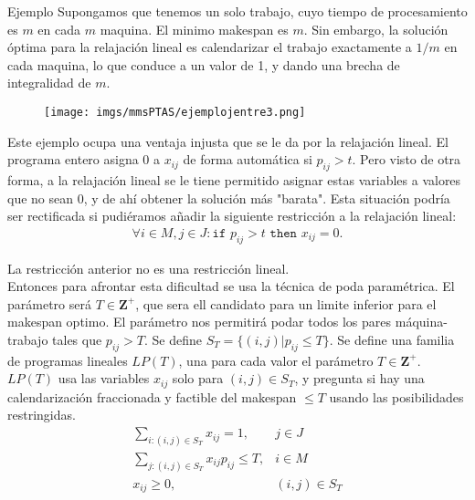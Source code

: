 \begin{frame}{Ejemplo}
Supongamos que tenemos un solo trabajo, cuyo tiempo de procesamiento es $m$ en cada $m$ maquina. El minimo makespan es $m$. Sin embargo, la solución óptima para la relajación lineal es calendarizar el trabajo exactamente a $1/m$ en cada maquina, lo que conduce a un
valor de 1, y dando una brecha de integralidad de $m$.
\begin{figure}
        \texttt{[image: imgs/mmsPTAS/ejemplojentre3.png]}
    \end{figure}
\end{frame}

\begin{frame}{\subsectiontitle}
Este ejemplo ocupa una ventaja injusta que se le da por la relajación lineal. El programa entero asigna 0 a $x_{ij}$ de forma automática si $p_{ij}>t$. Pero visto de otra forma, a la relajación lineal se le tiene permitido asignar estas variables a valores que no sean 0, y de ahí obtener la solución más "barata". Esta situación podría ser rectificada si pudiéramos añadir la siguiente restricción a la relajación lineal:\\
\begin{align*}
    \forall i \in M, j\in J : \texttt{if } p_{ij}>t \texttt{ then } x_{ij} = 0.
\end{align*}
\end{frame}

\begin{frame}{\subsectiontitle}
    La restricción anterior no es una restricción lineal.\\
    Entonces para afrontar esta dificultad se usa la técnica de poda paramétrica. El parámetro será $T\in \mathbf{Z}^+$, que sera ell candidato para un limite inferior para el makespan optimo. El parámetro nos permitirá podar todos los pares máquina-trabajo tales que $p_{ij} > T$. Se define $S_T=\{(i,j)|p_{ij}\leq T\}$. Se define una familia de programas lineales $LP(T)$, una para cada valor el parámetro $T\in \mathbf{Z}^+$. $LP(T)$ usa las variables $x_{ij}$ solo para $(i,j)\in S_T$, y pregunta si hay una calendarización fraccionada y factible del makespan $\leq T$ usando las posibilidades restringidas.
    \begin{align*}
    \sum_{i:(i,j)\in S_T}x_{ij}=1, &j \in J\\
    \sum_{j:(i,j)\in S_T}x_{ij}p_{ij}\leq T, &i \in M\\
    x_{ij}\geq 0, &(i,j) \in S_T\\
\end{align*}
\end{frame}

